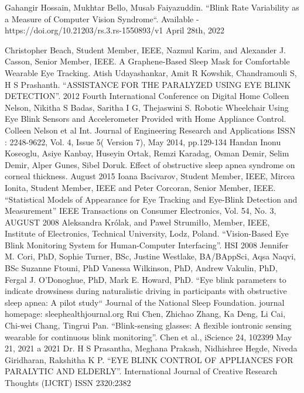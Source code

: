 \documentclass[conference]{IEEEtran}
\begin{document}
\begin{thebibliography}{00}
\bibitem{}
Gahangir Hossain, Mukhtar Bello, Musab Faiyazuddin. “Blink Rate Variability as a Measure of Computer Vision Syndrome“. Available - https://doi.org/10.21203/rs.3.rs-1550893/v1 April 28th, 2022



\bibitem{}
Christopher Beach, Student Member, IEEE, Nazmul Karim, and Alexander J. Casson, Senior Member, IEEE. A Graphene-Based Sleep Mask for Comfortable Wearable Eye Tracking.
\bibitem{}
Atish Udayashankar, Amit R Kowshik, Chandramouli S, H S Prashanth. “ASSISTANCE FOR THE PARALYZED USING EYE BLINK DETECTION”.  2012 Fourth International Conference on Digital Home
\bibitem{}
Colleen Nelson, Nikitha S Badas, Saritha I G, Thejaswini S. Robotic Wheelchair Using Eye Blink Sensors and Accelerometer Provided with Home Appliance Control. Colleen Nelson et al Int. Journal of Engineering Research and Applications ISSN : 2248-9622, Vol. 4, Issue 5( Version 7), May 2014, pp.129-134
\bibitem{}
Handan Inonu Koseoglu, Asiye Kanbay, Huseyin Ortak, Remzi Karadag, Osman Demir, Selim Demir, Alper Gunes, Sibel Doruk. Effect of obstructive sleep apnea syndrome on corneal thickness. August 2015
\bibitem{}
Ioana Bacivarov, Student Member, IEEE, Mircea Ionita, Student Member, IEEE and Peter Corcoran, Senior Member, IEEE. “Statistical Models of Appearance for Eye Tracking and Eye-Blink Detection and Measurement” IEEE Transactions on Consumer Electronics, Vol. 54, No. 3, AUGUST 2008
\bibitem{}
Aleksandra Królak, and Paweł Strumiłło, Member, IEEE, Institute of Electronics, Technical University, Lodz, Poland. “Vision-Based Eye Blink Monitoring System for Human-Computer Interfacing”. HSI 2008
\bibitem{}
Jennifer M. Cori, PhD, Sophie Turner, BSc, Justine Westlake, BA/BAppSci, Aqsa Naqvi, BSc Suzanne Ftouni, PhD Vanessa Wilkinson, PhD, Andrew Vakulin, PhD, Fergal J. O'Donoghue, PhD, Mark E. Howard, PhD. “Eye blink parameters to indicate drowsiness during naturalistic driving in participants with obstructive sleep apnea: A pilot study“ Journal of the National Sleep Foundation. journal homepage: sleephealthjournal.org
\bibitem{}
Rui Chen, Zhichao Zhang, Ka Deng, Li Cai, Chi-wei Chang, Tingrui Pan. “Blink-sensing glasses: A flexible iontronic sensing wearable for continuous blink monitoring”. Chen et al., iScience 24, 102399 May 21, 2021 a 2021
\bibitem{}
Dr. H S Prasantha, Meghana Prakash, Nidhishree Hegde, Niveda Giridharan, Rakshitha K P. “EYE BLINK CONTROL OF APPLIANCES FOR PARALYTIC AND ELDERLY”. International Journal of Creative Research Thoughts (IJCRT) ISSN 2320:2382



\end{thebibliography}
\end{document}
